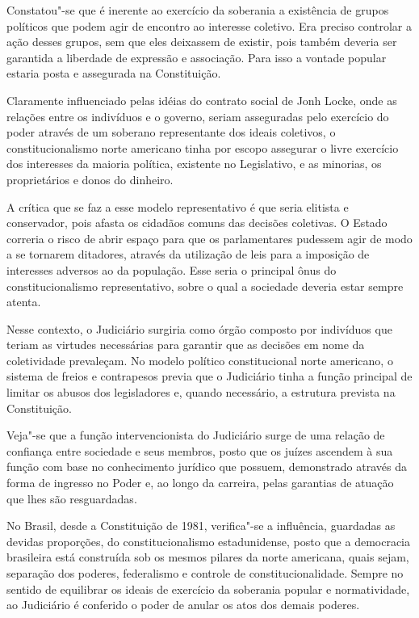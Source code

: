 {Constatou"-se que é inerente ao exercício da soberania a existência de
grupos políticos que podem agir de encontro ao interesse coletivo. Era
preciso controlar a ação desses grupos, sem que eles deixassem de
existir, pois também deveria ser garantida a liberdade de expressão e
associação. Para isso a vontade popular estaria posta e assegurada na
Constituição.

Claramente influenciado pelas idéias do contrato social de Jonh Locke,
onde as relações entre os indivíduos e o governo, seriam asseguradas
pelo exercício do poder através de um soberano representante dos ideais
coletivos, o constitucionalismo norte americano tinha por escopo
assegurar o livre exercício dos interesses da maioria política,
existente no Legislativo, e as minorias, os proprietários e donos do
dinheiro.

A crítica que se faz a esse modelo representativo é que seria elitista e
conservador, pois afasta os cidadãos comuns das decisões coletivas. O
Estado correria o risco de abrir espaço para que os parlamentares
pudessem agir de modo a se tornarem ditadores, através da utilização de
leis para a imposição de interesses adversos ao da população. Esse seria
o principal ônus do constitucionalismo representativo, sobre o qual a
sociedade deveria estar sempre atenta.

Nesse contexto, o Judiciário surgiria como órgão composto por indivíduos
que teriam as virtudes necessárias para garantir que as decisões em nome
da coletividade prevaleçam. No modelo político constitucional norte
americano, o sistema de freios e contrapesos previa que o Judiciário
tinha a função principal de limitar os abusos dos legisladores e, quando
necessário, a estrutura prevista na Constituição.

Veja"-se que a função intervencionista do Judiciário surge de uma relação
de confiança entre sociedade e seus membros, posto que os juízes
ascendem à sua função com base no conhecimento jurídico que possuem,
demonstrado através da forma de ingresso no Poder e, ao longo da
carreira, pelas garantias de atuação que lhes são resguardadas.

No Brasil, desde a Constituição de 1981, verifica"-se a influência,
guardadas as devidas proporções, do constitucionalismo estadunidense,
posto que a democracia brasileira está construída sob os mesmos pilares
da norte americana, quais sejam, separação dos poderes, federalismo e
controle de constitucionalidade. Sempre no sentido de equilibrar os
ideais de exercício da soberania popular e normatividade, ao Judiciário
é conferido o poder de anular os atos dos demais poderes.

}
